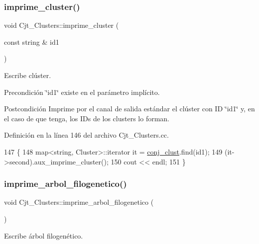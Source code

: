 \subsubsection{\texorpdfstring{imprime\+\_\+cluster()}{imprime\_cluster()}}
{\footnotesize\ttfamily void Cjt\+\_\+\+Clusters\+::imprime\+\_\+cluster (\begin{DoxyParamCaption}\item[{const string \&}]{id1 }\end{DoxyParamCaption})}



Escribe clúster. 

\begin{DoxyPrecond}{Precondición}
\char`\"{}id1\char`\"{} existe en el parámetro implícito. 
\end{DoxyPrecond}
\begin{DoxyPostcond}{Postcondición}
Imprime por el canal de salida estándar el clúster con ID \char`\"{}id1\char`\"{} y, en el caso de que tenga, los ID\textquotesingle{}s de los clusters lo forman. 
\end{DoxyPostcond}


Definición en la línea 146 del archivo Cjt\+\_\+\+Clusters.\+cc.


\begin{DoxyCode}
147 \{
148     map<string, Cluster>::iterator it = \hyperlink{class_cjt___clusters_a1202e93aafa953b2dc9a76d03f056b08}{conj\_clust}.find(id1);
149     (it->second).aux\_imprime\_cluster(); 
150     cout << endl;
151 \}
\end{DoxyCode}
\mbox{\label{class_cjt___clusters_a95262506a2fdc5455ce104fb84649ee9}} 
\subsubsection{\texorpdfstring{imprime\+\_\+arbol\+\_\+filogenetico()}{imprime\_arbol\_filogenetico()}}
{\footnotesize\ttfamily void Cjt\+\_\+\+Clusters\+::imprime\+\_\+arbol\+\_\+filogenetico (\begin{DoxyParamCaption}{ }\end{DoxyParamCaption})}



Escribe árbol filogenético. 

